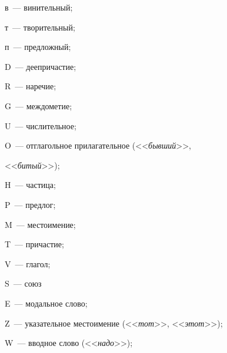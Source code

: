 в~--- винительный;





т~--- творительный;





п~--- предложный;





D~--- деепричастие;





R~--- наречие;





G~--- междометие;





U~--- числительное;





O~---  отглагольное прилагательное (<<\textit{бывший}>>, 


<<\textit{битый}>>);





H~--- частица;





P~--- предлог;





M~--- местоимение;





T~--- причастие;





V~--- глагол;





S~--- союз





E~--- модальное слово;





Z~--- указательное местоимение (<<\textit{тот}>>, <<\textit{этот}>>);





W~--- вводное слово (<<\textit{надо}>>);





